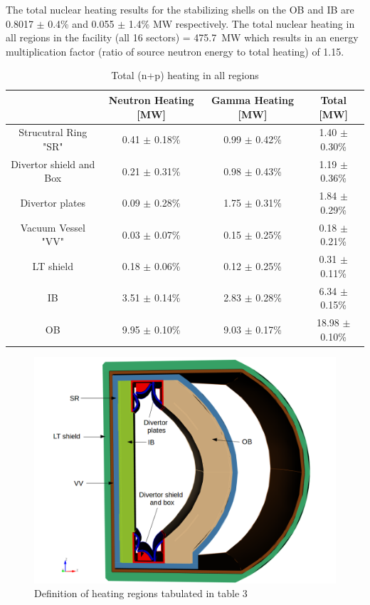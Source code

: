 \documentclass[12pt, letterpaper]{elsarticle}
\begin{document}
The total nuclear heating results for the stabilizing shells on the OB and IB are 0.8017 $\pm$ 0.4\% and 0.055 $\pm$ 1.4\% MW respectively. The total nuclear heating in all regions in the facility (all 16 sectors) = \SI{475.7}{MW} which results in an energy multiplication factor (ratio of source neutron energy to total heating) of 1.15. 
\begin{table}[h!]
	\caption{Total (n+p) heating in all regions}
	\label{np_heating}
	\centering
	\begin{tabular}{ |c|c|c|c| }
		\hline
		 {} & Neutron Heating [MW] & Gamma Heating [MW] & Total [MW] \\
		\hline
		{Strucutral Ring "SR"} & 0.41 $\pm$ 0.18\% & 0.99 $\pm$ 0.42\% & 1.40 $\pm$ 0.30\% \\
		\hline
		{Divertor shield and Box} & 0.21 $\pm$ 0.31\% & 0.98 $\pm$ 0.43\% & 1.19 $\pm$ 0.36\% \\
		\hline
		{Divertor plates} & 0.09 $\pm$ 0.28\% & 1.75 $\pm$ 0.31\% & 1.84 $\pm$ 0.29\% \\
		\hline
		{Vacuum Vessel "VV"} & 0.03 $\pm$ 0.07\% & 0.15 $\pm$ 0.25\% & 0.18 $\pm$ 0.21\% \\
		\hline
		{LT shield} & 0.18 $\pm$ 0.06\% & 0.12 $\pm$ 0.25\% & 0.31 $\pm$ 0.11\% \\
		\hline
		{IB} & 3.51 $\pm$ 0.14\% & 2.83 $\pm$ 0.28\% & 6.34 $\pm$ 0.15\% \\
		\hline
		{OB} & 9.95 $\pm$ 0.10\% & 9.03 $\pm$ 0.17\% & 18.98 $\pm$ 0.10\% \\
		\hline
	\end{tabular}
\end{table}
\begin{figure}[h!]
  \centering
  \includegraphics[scale=0.4]{../plots/heating_regions.png}
  \caption{Definition of heating regions tabulated in table 3}
  \label{fig:Heating regions}
\end{figure}
\end{document}
